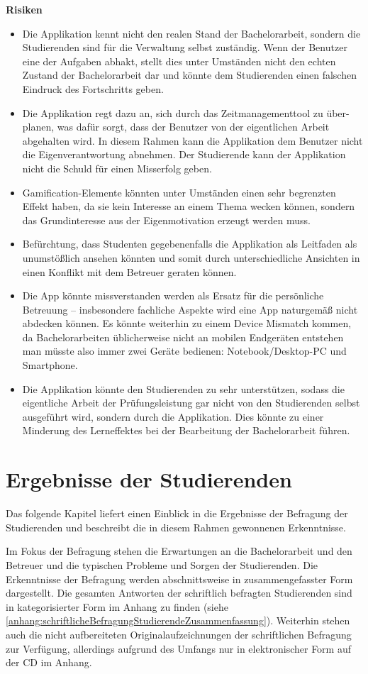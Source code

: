 \documentclass[bibliography=totoc,listof=totoc,BCOR=5mm,DIV=12,oneside]{scrbook}
\begin{document}
\newpage
\par \bigskip \textbf{Risiken}
\begin{itemize}
\item Die Applikation kennt nicht den realen Stand der Bachelorarbeit, sondern die Studierenden sind für die Verwaltung selbst zuständig. Wenn der Benutzer eine der Aufgaben abhakt, stellt dies unter Umständen nicht den echten Zustand der Bachelorarbeit dar und könnte dem Studierenden einen falschen Eindruck des Fortschritts geben.
\item Die Applikation regt dazu an, sich durch das Zeitmanagementtool zu über-planen, was dafür sorgt, dass der Benutzer von der eigentlichen Arbeit abgehalten wird. In diesem Rahmen kann die Applikation dem Benutzer nicht die Eigenverantwortung abnehmen. Der Studierende kann der Applikation nicht die Schuld für einen Misserfolg geben.
\item Gamification-Elemente könnten unter Umständen einen sehr begrenzten Effekt haben, da sie kein Interesse an einem Thema wecken können, sondern das Grundinteresse aus der Eigenmotivation erzeugt werden muss.
\item Befürchtung, dass Studenten gegebenenfalls die Applikation als Leitfaden als unumstößlich ansehen könnten und somit durch unterschiedliche Ansichten in einen Konflikt mit dem Betreuer geraten können.
\item Die App könnte missverstanden werden als Ersatz für die persönliche Betreuung – insbesondere fachliche Aspekte wird eine App naturgemäß nicht abdecken können. Es könnte weiterhin zu einem \grqq Device Mismatch\grqq{} kommen, da Bachelorarbeiten üblicherweise nicht an mobilen Endgeräten entstehen man müsste also immer zwei Geräte bedienen: Notebook/Desktop-PC und Smartphone.
\item Die Applikation könnte den Studierenden zu sehr unterstützen, sodass die eigentliche Arbeit der Prüfungsleistung gar nicht von den Studierenden selbst ausgeführt wird, sondern durch die Applikation. Dies könnte zu einer Minderung des Lerneffektes bei der Bearbeitung der Bachelorarbeit führen.

\end{itemize}

\newpage
\section{Ergebnisse der Studierenden}
\par Das folgende Kapitel liefert einen Einblick in die Ergebnisse der Befragung der Studierenden und beschreibt die in diesem Rahmen gewonnenen Erkenntnisse.
\par Im Fokus der Befragung stehen die Erwartungen an die Bachelorarbeit und den Betreuer und die typischen Probleme und Sorgen der Studierenden. Die Erkenntnisse der Befragung werden abschnittsweise in zusammengefasster Form dargestellt. Die gesamten Antworten der schriftlich befragten Studierenden sind in kategorisierter Form im Anhang zu finden (siehe \ref{anhang:schriftlicheBefragungStudierendeZusammenfassung}). Weiterhin stehen auch die nicht aufbereiteten Originalaufzeichnungen der schriftlichen Befragung zur Verfügung, allerdings aufgrund des Umfangs nur in elektronischer Form auf der CD im Anhang.
\end{document}
